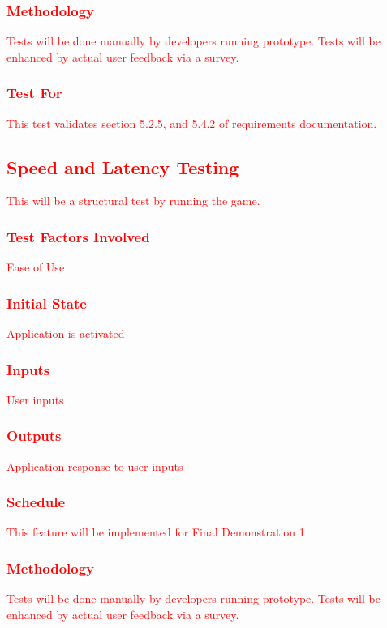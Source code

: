 \documentclass[11pt, oneside]{article}   	%
\begin{document}
\subsubsection{\textcolor{red}{Methodology}}
\textcolor{red}{Tests will be done manually by developers running prototype. Tests will be enhanced by actual user feedback via a survey.}
\subsubsection{\textcolor{red}{Test For}}
\textcolor{red}{This test validates section 5.2.5, and 5.4.2 of requirements documentation.}



\subsection{\textcolor{red}{Speed and Latency Testing}}
\textcolor{red}{This will be a structural test by running the game.}
\subsubsection{\textcolor{red}{Test Factors Involved}}
\textcolor{red}{Ease of Use}
\subsubsection{\textcolor{red}{Initial State}}
\textcolor{red}{Application is activated}
\subsubsection{\textcolor{red}{Inputs}}
\textcolor{red}{User inputs}
\subsubsection{\textcolor{red}{Outputs}}
\textcolor{red}{Application response to user inputs}
\subsubsection{\textcolor{red}{Schedule}}
\textcolor{red}{This feature will be implemented for Final Demonstration 1}
\subsubsection{\textcolor{red}{Methodology}}
\textcolor{red}{Tests will be done manually by developers running prototype. Tests will be enhanced by actual user feedback via a survey.}
\end{document}
